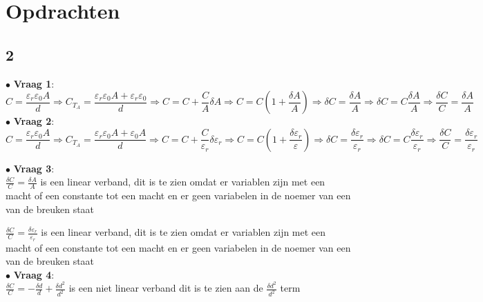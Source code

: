 \section{Opdrachten}
\subsection{2}
$\bullet$ \textbf{Vraag 1}:\\
    \begin{equation} \label{eq:a}
        C=\frac{\varepsilon_r\varepsilon_0A}{d}\Rightarrow C_{T_A}=\frac{\varepsilon_r \varepsilon_0A + \varepsilon_r \varepsilon_0}{d} \Rightarrow C = C + \frac{C}{A}\delta A \Rightarrow C=C(1+\frac{\delta A}{A}) \Rightarrow \delta C=\frac{\delta A}{A} \Rightarrow \delta C = C\frac{\delta A}{A}\Rightarrow \frac{\delta C}{C}=\frac{\delta A}{A}
    \end{equation}
    $\bullet$ \textbf{Vraag 2}:\\
    \begin{equation} \label{eq:epsilonR}
        C=\frac{\varepsilon_r\varepsilon_0A}{d}\Rightarrow C_{T_A}=\frac{\varepsilon_r \varepsilon_0A + \varepsilon_0A}{d} \Rightarrow C = C + \frac{C}{\varepsilon_r}\delta\varepsilon_r \Rightarrow C=C(1+\frac{\delta \varepsilon_r}{\varepsilon}) \Rightarrow \delta C=\frac{\delta \varepsilon_r}{\varepsilon_r} \Rightarrow \delta C = C\frac{\delta \varepsilon_r}{\varepsilon_r}\Rightarrow \frac{\delta C}{C}=\frac{\delta \varepsilon_r}{\varepsilon_r}
    \end{equation}

    \noindent
    $\bullet$ \textbf{Vraag 3}:\\

    $\frac{\delta C}{C}=\frac{\delta A}{A}$ is een linear verband, dit is te zien omdat er variablen zijn met een macht of een constante tot een macht en er geen variabelen in de noemer van een van de breuken staat

    \noindent
    $\frac{\delta C}{C}=\frac{\delta \varepsilon_r}{\varepsilon_r}$ is een linear verband, dit is te zien omdat er variablen zijn met een macht of een constante tot een macht en er geen variabelen in de noemer van een van de breuken staat\\

    \noindent
    $\bullet$ \textbf{Vraag 4}:\\

    $\frac{\delta C}{C}=-\frac{\delta d}{d}+\frac{\delta d^2}{d^2}$ is een niet linear verband dit is te zien aan de $\frac{\delta d^2}{d^2}$ term\\


